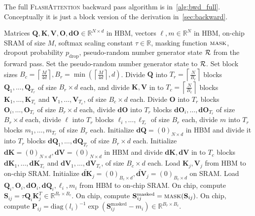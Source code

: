 \documentclass{article}
\newcommand{\diag}{\mathrm{diag}}
\newcommand{\vQ}{\mathbf{Q}}
\newcommand{\vK}{\mathbf{K}}
\newcommand{\vV}{\mathbf{V}}
\newcommand{\vdQ}{\mathbf{dQ}}
\newcommand{\vdK}{\mathbf{dK}}
\newcommand{\vdV}{\mathbf{dV}}
\newcommand{\vS}{\mathbf{S}}
\newcommand{\vP}{\mathbf{P}}
\newcommand{\vO}{\mathbf{O}}
\newcommand{\vdO}{\mathbf{dO}}
\newcommand{\sysname}{\textsc{FlashAttention}\xspace}
\begin{document}
The full \sysname backward pass algorithm is in~\cref{alg:bwd_full}.
Conceptually it is just a block version of the derivation
in~\cref{sec:backward}.

\iftoggle{arxiv}{
\begin{algorithm}[H]
} {
\begin{algorithm}[h]
}
  \caption{\small\label{alg:bwd_full}\sysname Backward Pass}
  \begin{algorithmic}[1]
    \REQUIRE Matrices $\vQ, \vK, \vV, \vO, \vdO \in \mathbb{R}^{N \times d}$ in HBM,
    vectors $\ell, m \in \mathbb{R}^N$ in HBM, on-chip SRAM of
    size $M$, softmax scaling constant $\tau \in \mathbb{R}$, masking function
    $\textsc{mask}$, dropout probability $p_\mathrm{drop}$, pseudo-random number
    generator state ${\cal R}$ from the forward pass.
    \STATE Set the pseudo-random number generator state to ${\cal R}$.
    \STATE Set block sizes $B_c = \left\lceil \frac{M}{4d} \right\rceil, B_r = \min \left( \left\lceil \frac{M}{4d} \right\rceil , d \right)$.
    \STATE Divide $\vQ$ into $T_r = \left\lceil\frac{N}{B_r} \right\rceil$ blocks $\vQ_1, \dots, \vQ_{T_r}$ of size $B_r \times d$ each,
    and divide $\vK, \vV$ in to $T_c = \left\lceil \frac{N}{B_c} \right\rceil$ blocks $\vK_1, \dots, \vK_{T_c}$ and
    $\vV_1, \dots, \vV_{T_c}$, of size $B_c \times d$ each.
    \STATE Divide $\vO$ into $T_r$ blocks $\vO_i, \dots, \vO_{T_r}$ of size
    $B_r \times d$ each, divide $\vdO$ into $T_r$ blocks $\vdO_i, \dots, \vdO_{T_r}$
    of size $B_r \times d$ each, divide $\ell$ into $T_r$ blocks $\ell_i, \dots, \ell_{T_r}$ of size
    $B_r$ each, divide $m$ into $T_r$ blocks $m_1, \dots, m_{T_r}$ of size $B_r$ each.
    \STATE Initialize $\vdQ = (0)_{N \times d}$ in HBM and divide it into $T_r$ blocks $\vdQ_1, \dots, \vdQ_{T_r}$ of size $B_r \times d$ each.
    Initialize $\vdK = (0)_{N \times d}, \vdV = (0)_{N \times d}$ in HBM and divide $\vdK, \vdV$ in to $T_c$ blocks $\vdK_1, \dots, \vdK_{T_c}$ and
    $\vdV_1, \dots, \vdV_{T_c}$, of size $B_c \times d$ each.
      \STATE Load $\vK_j, \vV_j$ from HBM to on-chip SRAM.
      \STATE Initialize $\tilde{\vdK}_j = (0)_{B_c \times d}, \tilde{\vdV}_j = (0)_{B_c \times d}$ on SRAM.
        \STATE Load $\vQ_i, \vO_i, \vdO_i, \vdQ_i, \ell_i, m_i$ from HBM to on-chip SRAM.
        \STATE On chip, compute $\vS_{ij} = \tau \vQ_i \vK_j^T \in \mathbb{R}^{B_r \times B_c}$.
        \STATE On chip, compute $\vS_{ij}^{\mathrm{masked}} = \textsc{mask}(\vS_{ij})$.
        \STATE On chip, compute $\vP_{ij} = \diag(l_i)^{-1}\exp(\vS_{ij}^{\mathrm{masked}} - m_{i}) \in \mathbb{R}^{B_r \times B_c}$.

\end{algorithmic}
\end{document}
